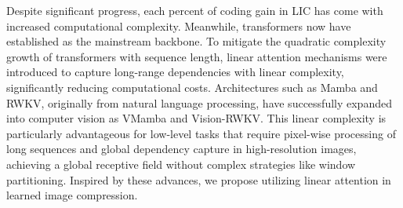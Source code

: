 %
%
Despite significant progress, each percent of coding gain in LIC has come with increased computational complexity. Meanwhile, transformers now have established as the mainstream backbone. To mitigate the quadratic complexity growth of transformers with sequence length, linear attention mechanisms were introduced to capture long-range dependencies with linear complexity, significantly reducing computational costs. Architectures such as Mamba\cite{Gu2023MambaLS} and RWKV\cite{Peng.2023.RWKV}, originally from natural language processing, have successfully expanded into computer vision as VMamba\cite{Liu2024VMambaVS} and Vision-RWKV\cite{Duan.2024.Vision-RWKV}. This linear complexity is particularly advantageous for low-level tasks that require pixel-wise processing of long sequences and global dependency capture in high-resolution images, achieving a global receptive field without complex strategies like window partitioning. Inspired by these advances, we propose utilizing linear attention in learned image compression.




